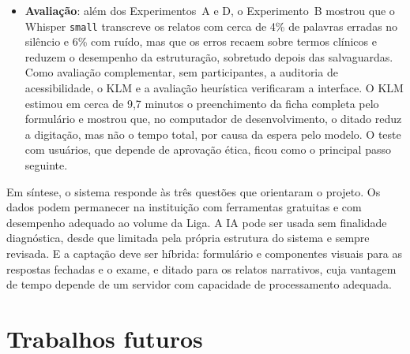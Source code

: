 \begin{itemize}
	\item \textbf{Avaliação}: além dos Experimentos~A e D, o Experimento~B mostrou que o Whisper \texttt{small} transcreve os relatos com cerca de 4\% de palavras erradas no silêncio e 6\% com ruído, mas que os erros recaem sobre termos clínicos e reduzem o desempenho da estruturação, sobretudo depois das salvaguardas. Como avaliação complementar, sem participantes, a auditoria de acessibilidade, o KLM e a avaliação heurística verificaram a interface. O KLM estimou em cerca de 9,7 minutos o preenchimento da ficha completa pelo formulário e mostrou que, no computador de desenvolvimento, o ditado reduz a digitação, mas não o tempo total, por causa da espera pelo modelo. O teste com usuários, que depende de aprovação ética, ficou como o principal passo seguinte.
\end{itemize}

Em síntese, o sistema responde às três questões que orientaram o projeto. Os dados podem permanecer na instituição com ferramentas gratuitas e com desempenho adequado ao volume da Liga. A IA pode ser usada sem finalidade diagnóstica, desde que limitada pela própria estrutura do sistema e sempre revisada. E a captação deve ser híbrida: formulário e componentes visuais para as respostas fechadas e o exame, e ditado para os relatos narrativos, cuja vantagem de tempo depende de um servidor com capacidade de processamento adequada.

\section{Trabalhos futuros}

